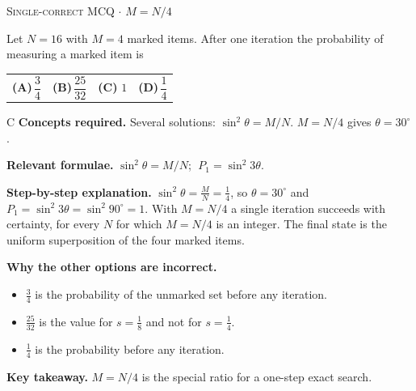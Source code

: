 \documentclass[11pt,a4paper]{article}
\newcommand{\optlabel}[1]{\textbf{(#1)}}
\newcommand{\correctlabel}[1]{\textcolor{okgreen}{\textbf{(#1)}\,\ding{51}}}
\newenvironment{qitem}[1]{\begin{list}{}{\setlength{\leftmargin}{3.3em}\setlength{\labelwidth}{3.1em}%
  \setlength{\labelsep}{0.2em}\setlength{\topsep}{3pt}\setlength{\parsep}{3pt}}\item[\textbf{Q.#1}\hfill]}{\end{list}}
\newcommand{\qsep}{\par\vspace{2pt}{\color{black!15}\hrule}\vspace{4pt}}
\newcommand{\qmeta}[2]{{\footnotesize\color{black!60}\textsc{#1} \;$\cdot$\; #2}\par}
\begin{document}
\begin{qitem}{49}
\qmeta{Single-correct MCQ}{$M = N/4$}
Let $N = 16$ with $M = 4$ marked items. After one iteration the probability of measuring a marked item is
\par\smallskip\noindent\begin{tabularx}{\linewidth}{@{}*{4}{L}@{}}
\optlabel{A}\,$\dfrac34$ & \optlabel{B}\,$\dfrac{25}{32}$ & \correctlabel{C}\,$1$ & \optlabel{D}\,$\dfrac14$
\end{tabularx}
\end{qitem}
\begin{solbox}{C}
\textbf{\color{brand}Concepts required.} Several solutions: $\sin^2\theta = M/N$. $M = N/4$ gives $\theta = 30^\circ$.

\textbf{\color{brand}Relevant formulae.} $\sin^2\theta = M/N$; $\;P_1 = \sin^2 3\theta$.

\textbf{\color{brand}Step-by-step explanation.} $\sin^2\theta = \frac{M}{N} = \frac14$, so $\theta = 30^\circ$ and $P_1 = \sin^2 3\theta = \sin^2 90^\circ = 1$. With $M = N/4$ a single iteration succeeds with certainty, for every $N$ for which $M = N/4$ is an integer.
The final state is the uniform superposition of the four marked items.

\textbf{\color{brand}Why the other options are incorrect.}
\begin{itemize}[leftmargin=2.4em, itemsep=1pt, topsep=2pt]
\item[\textbf{(A)}] $\frac34$ is the probability of the unmarked set before any iteration.
\item[\textbf{(B)}] $\frac{25}{32}$ is the value for $s = \frac18$ and not for $s = \frac14$.
\item[\textbf{(D)}] $\frac14$ is the probability before any iteration.
\end{itemize}
\textbf{\color{brand}Key takeaway.} $M = N/4$ is the special ratio for a one-step exact search.
\end{solbox}
\qsep
\end{document}
